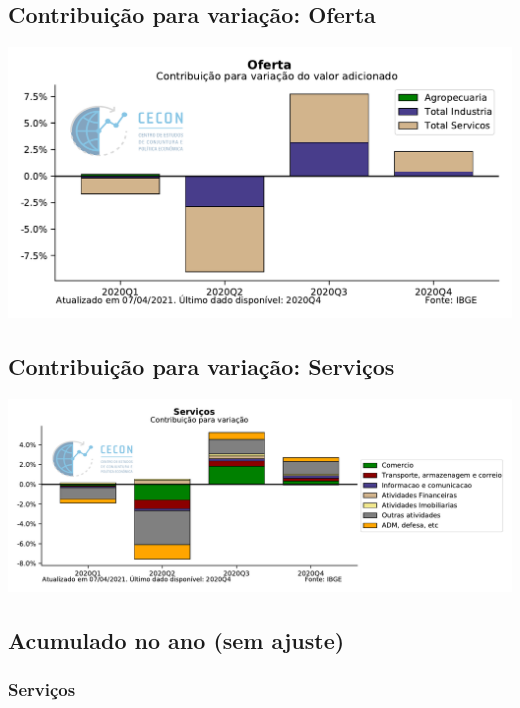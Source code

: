 \documentclass{SelfArx}
\begin{document}
\subsection*{Contribuição para variação: Oferta}
\label{sec:org802858d}

\begin{center}
\includegraphics[width=.9\linewidth]{./figs/PIB/Contrib_Oferta.pdf}
\end{center}


\subsection*{Contribuição para variação: Serviços}
\label{sec:org5f08c3f}

\begin{center}
\includegraphics[width=.9\linewidth]{./figs/PIB/Contrib_Servicos.pdf}
\end{center}

\subsection*{Acumulado no ano (sem ajuste)}
\label{sec:orgf3d5f06}

\subsubsection*{Serviços}
\label{sec:org0d8997d}
\end{document}
